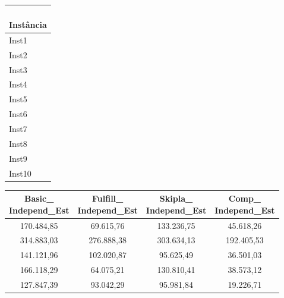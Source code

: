 \begin{table}[H]
	\centering
	\setlength{\tabcolsep}{4pt}
	\scriptsize
	\begin{subtable}[t]{0.10\textwidth}
		\centering
		\begin{tabular}{@{}l@{}}
			\toprule
			\makecell[l]{\textbf{ } \\\textbf{Instância}}  \\
			\midrule
			Inst1                   \\
			Inst2                   \\
			Inst3                   \\
			Inst4                   \\
			Inst5                   \\
			Inst6                   \\
			Inst7                   \\
			Inst8                   \\
			Inst9                   \\
			Inst10                  \\
			\bottomrule
		\end{tabular}
	\end{subtable}
	\hfill
	\begin{subtable}[t]{0.43\textwidth}
		\centering
		\begin{tabular}{@{}cccc@{}}
			\toprule
			\makecell[c]{\textbf{Basic\_}                                          \\\textbf{Independ\_Est}}
			           & \makecell[c]{\textbf{Fulfill\_}                           \\\textbf{Independ\_Est}}
			           & \makecell[c]{\textbf{Skipla\_}                            \\\textbf{Independ\_Est}}
			           & \makecell[c]{\textbf{Comp\_}                              \\\textbf{Independ\_Est}} \\
			\midrule
			170.484,85 & 69.615,76                       & 133.236,75 & 45.618,26  \\
			314.883,03 & 276.888,38                      & 303.634,13 & 192.405,53 \\
			141.121,96 & 102.020,87                      & 95.625,49  & 36.501,03  \\
			166.118,29 & 64.075,21                       & 130.810,41 & 38.573,12  \\
			127.847,39 & 93.042,29                       & 95.981,84  & 19.226,71  \\

\end{tabular}
\end{subtable}
\end{table}
